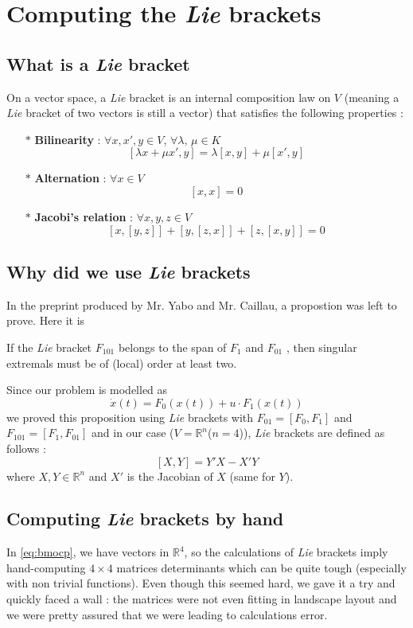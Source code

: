 \documentclass{tudelft-report}
\begin{document}
\chapter{Computing the \textit{Lie} brackets}
\label{chapter:liebrackets}
\section*{What is a \textit{Lie} bracket}
On a vector space, a \textit{Lie} bracket is an internal composition law  on $V$ (meaning a \textit{Lie} bracket of two vectors is still a vector) that satisfies the following properties :
\begin{itemize}
 \item[$*$] \textbf{Bilinearity} : $\forall x, x', y \in V$, $\forall \lambda,\, \mu \in K$
 $$[\lambda x + \mu x', y] = \lambda[x, y] + \mu[x',y]$$
 \item[$*$] \textbf{Alternation} : $\forall x \in V$
 $$[x,x] = 0$$
 \item[$*$] \textbf{Jacobi's relation} : $\forall x,y,z\in V$ 
 $$[x,[y,z]] + [y,[z,x]] + [z,[x,y]] = 0$$
\end{itemize}
\section*{Why did we use \textit{Lie} brackets}
In the preprint produced by Mr. Yabo and Mr. Caillau, a propostion was left to prove. Here it is
\color{title}
\begin{proposition}\color{black}\label{proposition:lie}\indent
 If the \textit{Lie} bracket $F_{101}$ belongs to the span of $F_1$ and $F_{01}$ , then
singular extremals must be of (local) order at least two.
\end{proposition}\color{black}\noindent
Since our problem is modelled as $$\dot{x}(t) = F_0(x(t)) + u\cdot F_1(x(t))$$
we proved this proposition using \textit{Lie} brackets with $F_{01} = [F_0, F_1]$ and $F_{101} = [F_1, F_{01}]$ and in our case ($V=\mathbb{R}^n$($n=4$)), \textit{Lie} brackets are defined as follows : 
$$[X, Y] = Y'X - X'Y$$ where $X,Y\in\mathbb{R}^n$ and $X'$ is the Jacobian of $X$ (same for $Y$).
\section*{Computing \textit{Lie} brackets by hand}
In \eqref{eq:bmocp}, we have vectors in $\mathbb{R}^4$, so the calculations of \textit{Lie} brackets imply hand-computing $4\times 4$ matrices determinants which can be quite tough (especially with non trivial functions). Even though this seemed hard, we gave it a try and quickly faced a wall : the matrices were not even fitting in landscape layout and we were pretty assured that we were leading to calculations error.
\end{document}

